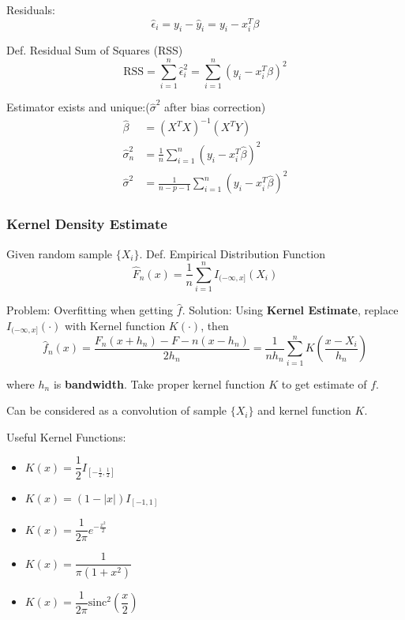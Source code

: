     Residuals:
    \[\hat{\epsilon}_i=y_i-\hat{y}_i=y_i-x_i^T\beta\]

    Def. Residual Sum of Squares (RSS)
    \[\mathrm{RSS}=\sum_{i=1}^n\hat{\epsilon}_i^2=\sum_{i=1}^n(y_i-x_i^T\beta)^2\]

    Estimator exists and unique:($\hat{\sigma}^2$ after bias correction)
    \begin{align*}
        \hat{\beta}&=(X^TX)^{-1}(X^TY)\\
        \hat{\sigma}_n^2&=\frac{1}{n}\sum_{i=1}^n(y_i-x^T_i\hat{\beta})^2\\
        \hat{\sigma}^2&=\frac{1}{n-p-1}\sum_{i=1}^n(y_i-x_i^T\hat{\beta})^2
    \end{align*}

\subsubsection{Kernel Density Estimate}\label{SubSectionKernelDensityEstimation}
    Given random sample $\{X_i\}$. Def. Empirical Distribution Function
    \begin{equation}\label{empiricaldisreibutionfunction}
        \hat{F}_n(x)=\frac{1}{n}\sum_{i=1}^nI_{(-\infty,x]}(X_i) 
    \end{equation}
        

    Problem: Overfitting when getting $\hat{f}$. Solution: Using \textbf{Kernel Estimate}, replace $I_{(-\infty,x]}(\cdot)$ with Kernel function $K(\cdot)$, then
    \[
        \hat{f}_n(x)=\dfrac{F_n(x+h_n)-F-n(x-h_n)}{2h_n}=\frac{1}{nh_n}\sum_{i=1}^nK(\frac{x-X_i}{h_n})
    \]

    where $h_n$ is \textbf{bandwidth}. Take proper kernel function $K$ to get estimate of $f$.

    Can be considered as a convolution of sample $\{X_i\}$ and kernel function $K$.

    Useful Kernel Functions:
    \begin{itemize}[itemsep= -6 pt,parsep= 0 pt]
        \item $K(x)=\dfrac{1}{2}I_{[-\frac{1}{2},\frac{1}{2}]}$\\
        \item $K(x)=(1-|x|)I_{[-1,1]}$\\
        \item $K(x)=\dfrac{1}{2\pi}e^{-\frac{x^2}{2}}$\\
        \item $K(x)=\dfrac{1}{\pi(1+x^2)}$\\
        \item $K(x)=\dfrac{1}{2\pi}\mathrm{sinc}^2(\dfrac{x}{2})$
    \end{itemize}
    










